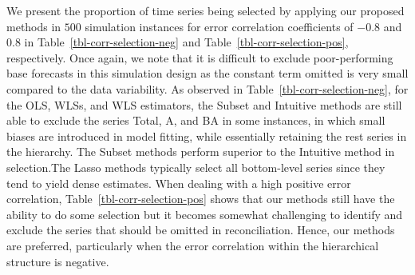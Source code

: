\documentclass[11pt,a4paper,]{article}
\begin{document}
We present the proportion of time series being selected by applying our
proposed methods in \(500\) simulation instances for error correlation
coefficients of \(-0.8\) and \(0.8\) in
Table~\ref{tbl-corr-selection-neg} and
Table~\ref{tbl-corr-selection-pos}, respectively. Once again, we note
that it is difficult to exclude poor-performing base forecasts in this
simulation design as the constant term omitted is very small compared to
the data variability. As observed in Table~\ref{tbl-corr-selection-neg},
for the OLS, WLSs, and WLS estimators, the Subset and Intuitive methods
are still able to exclude the series Total, A, and BA in some instances,
in which small biases are introduced in model fitting, while essentially
retaining the rest series in the hierarchy. The Subset methods perform
superior to the Intuitive method in selection.The Lasso methods
typically select all bottom-level series since they tend to yield dense
estimates. When dealing with a high positive error correlation,
Table~\ref{tbl-corr-selection-pos} shows that our methods still have the
ability to do some selection but it becomes somewhat challenging to
identify and exclude the series that should be omitted in
reconciliation. Hence, our methods are preferred, particularly when the
error correlation within the hierarchical structure is negative.
\end{document}
